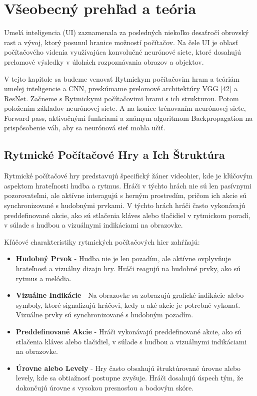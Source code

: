 \chapter{Všeobecný prehľad a teória}\label{chap:teoria}

Umelá inteligencia (UI) zaznamenala za posledných niekoľko desaťročí obrovský rast a vývoj, ktorý posunul hranice možností počítačov. Na čele UI je oblasť počítačového videnia využívajúca konvolučné neurónové siete, ktoré dosahujú prelomové výsledky v úlohách rozpoznávania obrazov a objektov.

V tejto kapitole sa budeme venovať Rytmickym počítačovim hram a teóriám umelej inteligencie a CNN, preskúmame prelomové architektúry VGG [42] a ResNet. Začneme s Rytmickymi počítačovimi hrami s ich strukturou. Potom položením základov neurónovej siete. A na koniec trénovaním neurónovej siete, Forward pass, aktivačnými funkciami a známym algoritmom Backpropagation na prispôsobenie váh, aby sa neurónová sieť mohla učiť.

\section{Rytmické Počítačové Hry a Ich Štruktúra}\label{sec:rytmicke_hry}


Rytmické počítačové hry predstavujú špecifický žáner videohier, kde je kľúčovým aspektom hrateľnosti hudba a rytmus. Hráči v týchto hrách nie sú len pasívnymi pozorovateľmi, ale aktívne interagujú s herným prostredím, pričom ich akcie sú synchronizované s hudobnými prvkami. V týchto hrách hráči často vykonávajú preddefinované akcie, ako sú stlačenia kláves alebo tlačidiel v rytmickom poradí, v súlade s hudbou a vizuálnymi indikáciami na obrazovke.

Kľúčové charakteristiky rytmických počítačových hier zahŕňajú:

\begin{itemize}
\item \textbf{Hudobný Prvok} - Hudba nie je len pozadím, ale aktívne ovplyvňuje hrateľnosť a vizuálny dizajn hry. Hráči reagujú na hudobné prvky, ako sú rytmus a melódia.
\item \textbf{Vizuálne Indikácie} - Na obrazovke sa zobrazujú grafické indikácie alebo symboly, ktoré signalizujú hráčovi, kedy a aké akcie je potrebné vykonať. Vizuálne prvky sú synchronizované s hudobným pozadím.
\item \textbf{Preddefinované Akcie} - Hráči vykonávajú preddefinované akcie, ako sú stlačenia kláves alebo tlačidiel, v súlade s hudbou a vizuálnymi indikáciami na obrazovke.
\item \textbf{Úrovne alebo Levely} - Hry často obsahujú štruktúrované úrovne alebo levely, kde sa obtiažnosť postupne zvyšuje. Hráči dosahujú úspech tým, že dokončujú úrovne s vysokou presnosťou a bodovým skóre.
\end{itemize}

